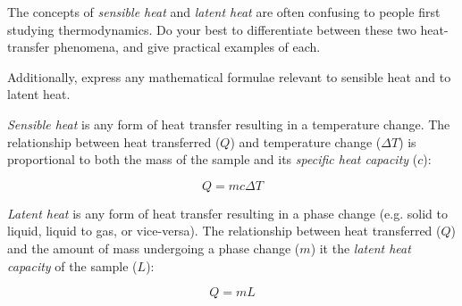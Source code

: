 

The concepts of {\it sensible heat} and {\it latent heat} are often confusing to people first studying thermodynamics.  Do your best to differentiate between these two heat-transfer phenomena, and give practical examples of each.

\vskip 10pt

Additionally, express any mathematical formulae relevant to sensible heat and to latent heat.







{\it Sensible heat} is any form of heat transfer resulting in a temperature change.  The relationship between heat transferred ($Q$) and temperature change ($\Delta T$) is proportional to both the mass of the sample and its {\it specific heat capacity} ($c$):

$$Q = mc \Delta T$$
 
\vskip 10pt

{\it Latent heat} is any form of heat transfer resulting in a phase change (e.g. solid to liquid, liquid to gas, or vice-versa).  The relationship between heat transferred ($Q$) and the amount of mass undergoing a phase change ($m$) it the {\it latent heat capacity} of the sample ($L$):

$$Q = mL$$











